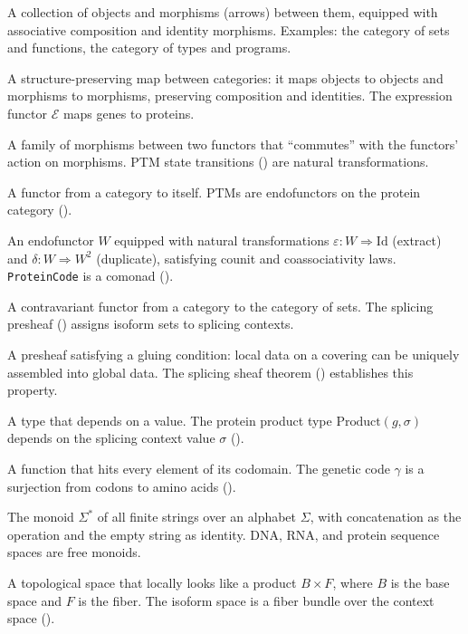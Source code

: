\documentclass[12pt,a4paper]{article}
\theoremstyle{definition}
\begin{document}
\begin{description}[style=nextline]
  \item[Category] A collection of objects and morphisms (arrows) between them, equipped with associative composition and identity morphisms. Examples: the category of sets and functions, the category of types and programs.

  \item[Functor] A structure-preserving map between categories: it maps objects to objects and morphisms to morphisms, preserving composition and identities. The expression functor $\mathcal{E}$ maps genes to proteins.

  \item[Natural transformation] A family of morphisms between two functors that ``commutes'' with the functors' action on morphisms. PTM state transitions () are natural transformations.

  \item[Endofunctor] A functor from a category to itself. PTMs are endofunctors on the protein category ().

  \item[Comonad] An endofunctor $W$ equipped with natural transformations $\varepsilon \colon W \Rightarrow \mathrm{Id}$ (extract) and $\delta \colon W \Rightarrow W^2$ (duplicate), satisfying counit and coassociativity laws. \texttt{ProteinCode} is a comonad ().

  \item[Presheaf] A contravariant functor from a category to the category of sets. The splicing presheaf () assigns isoform sets to splicing contexts.

  \item[Sheaf] A presheaf satisfying a gluing condition: local data on a covering can be uniquely assembled into global data. The splicing sheaf theorem () establishes this property.

  \item[Dependent type] A type that depends on a value. The protein product type $\text{Product}(g, \sigma)$ depends on the splicing context value $\sigma$ ().

  \item[Surjection] A function that hits every element of its codomain. The genetic code $\gamma$ is a surjection from codons to amino acids ().

  \item[Free monoid] The monoid $\Sigma^*$ of all finite strings over an alphabet $\Sigma$, with concatenation as the operation and the empty string as identity. DNA, RNA, and protein sequence spaces are free monoids.

  \item[Fiber bundle] A topological space that locally looks like a product $B \times F$, where $B$ is the base space and $F$ is the fiber. The isoform space is a fiber bundle over the context space ().
\end{description}
\end{document}

